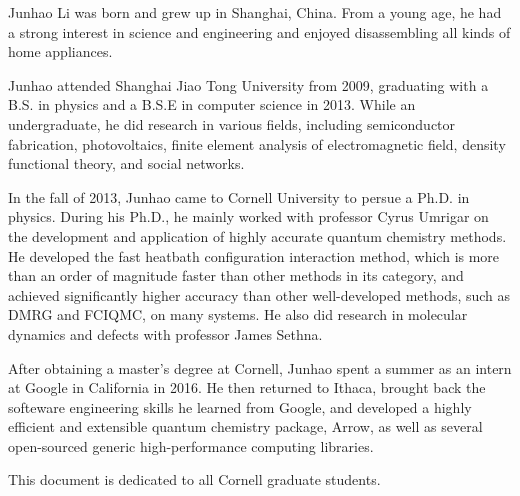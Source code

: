 \documentclass[phd,tocprelim]{cornell}
\begin{document}
\begin{biosketch}
Junhao Li was born and grew up in Shanghai, China.
From a young age, he had a strong interest in science and engineering and enjoyed disassembling all kinds of home appliances.

Junhao attended Shanghai Jiao Tong University from 2009, graduating with a B.S. in physics and a B.S.E in computer science in 2013.
While an undergraduate, he did research in various fields, including semiconductor fabrication, photovoltaics, finite element analysis of electromagnetic field, density functional theory, and social networks.

In the fall of 2013, Junhao came to Cornell University to persue a Ph.D. in physics.
During his Ph.D., he mainly worked with professor Cyrus Umrigar on the development and application of highly accurate quantum chemistry methods.
He developed the fast heatbath configuration interaction method, which is more than an order of magnitude faster than other methods in its category, and achieved significantly higher accuracy than other well-developed methods, such as DMRG and FCIQMC, on many systems.
He also did research in molecular dynamics and defects with professor James Sethna.

After obtaining a master's degree at Cornell, Junhao spent a summer as an intern at Google in California in 2016.
He then returned to Ithaca, brought back the softeware engineering skills he learned from Google, and developed a highly efficient and extensible quantum chemistry package, Arrow, as well as several open-sourced generic high-performance computing libraries.
\end{biosketch}

\begin{dedication}
This document is dedicated to all Cornell graduate students.
\end{dedication}
\end{document}
